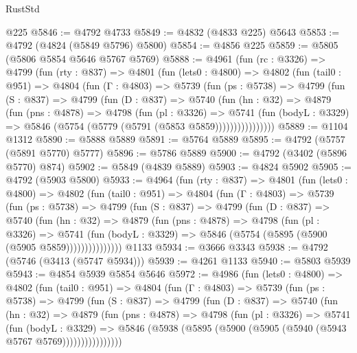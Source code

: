 \begin{lexlean}{RustStd}
\begin{coremodule}
    @225
@5846 := @4792 @4733
@5849 := @4832 (@4833 @225) @5643
@5853 := @4792 (@4824 (@5849 @5796) @5800)
@5854 := @4856 @225
@5859 := @5805 (@5806 @5854 @5646 @5767 @5769)
@5888 := @4961
    (fun (rc : @3326) =>
    @4799
      (fun (rty : @837) =>
      @4801
        (fun (lets0 : @4800) =>
        @4802
          (fun (tail0 : @951) =>
          @4804
            (fun (Γ : @4803) =>
            @5739
              (fun (ps : @5738) =>
              @4799
                (fun (S : @837) =>
                @4799
                  (fun (D : @837) =>
                  @5740
                    (fun (hn : @32) =>
                    @4879
                      (fun (pns : @4878) =>
                      @4798
                        (fun (pl : @3326) =>
                        @5741
                          (fun (bodyL : @3329) =>
                          @5846 (@5754 (@5779 (@5791 (@5853 @5859))))))))))))))))
@5889 := @1104 @1312
@5890 := @5888 @5889
@5891 := @5764 @5889
@5895 := @4792 (@5757 (@5891 @5770) @5777)
@5896 := @5786 @5889
@5900 := @4792 (@3402 (@5896 @5770) @874)
@5902 := @5849 (@4839 @5889)
@5903 := @4824 @5902
@5905 := @4792 (@5903 @5800)
@5933 := @4964
    (fun (rty : @837) =>
    @4801
      (fun (lets0 : @4800) =>
      @4802
        (fun (tail0 : @951) =>
        @4804
          (fun (Γ : @4803) =>
          @5739
            (fun (ps : @5738) =>
            @4799
              (fun (S : @837) =>
              @4799
                (fun (D : @837) =>
                @5740
                  (fun (hn : @32) =>
                  @4879
                    (fun (pns : @4878) =>
                    @4798
                      (fun (pl : @3326) =>
                      @5741
                        (fun (bodyL : @3329) =>
                        @5846 (@5754 (@5895 (@5900 (@5905 @5859)))))))))))))))
    @1133
@5934 := @3666 @3343
@5938 := @4792 (@5746 (@3413 (@5747 @5934)))
@5939 := @4261 @1133
@5940 := @5803 @5939
@5943 := @4854 @5939 @5854 @5646
@5972 := @4986
    (fun (lets0 : @4800) =>
    @4802
      (fun (tail0 : @951) =>
      @4804
        (fun (Γ : @4803) =>
        @5739
          (fun (ps : @5738) =>
          @4799
            (fun (S : @837) =>
            @4799
              (fun (D : @837) =>
              @5740
                (fun (hn : @32) =>
                @4879
                  (fun (pns : @4878) =>
                  @4798
                    (fun (pl : @3326) =>
                    @5741
                      (fun (bodyL : @3329) =>
                      @5846 (@5938 (@5895 (@5900 (@5905 (@5940 (@5943 @5767 @5769))))))))))))))))

\end{coremodule}
\end{lexlean}
